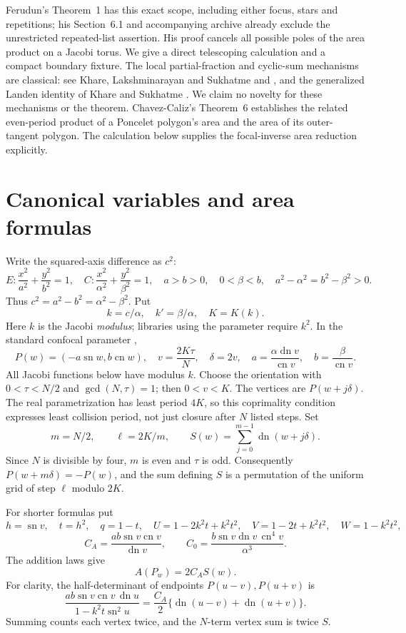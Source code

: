 \documentclass[11pt,letterpaper]{article}
\DeclareMathOperator{\sn}{sn}
\DeclareMathOperator{\cn}{cn}
\DeclareMathOperator{\dn}{dn}
\begin{document}
Ferudun's Theorem~1 \cite{ferudun} has this exact scope, including
either focus, stars and repetitions; his Section~6.1 and accompanying
archive already exclude the unrestricted repeated-list assertion.
His proof cancels all possible poles of the area product on a Jacobi
torus. We give a direct telescoping calculation and a compact
boundary fixture. The local partial-fraction and cyclic-sum
mechanisms are classical: see Khare, Lakshminarayan and Sukhatme
\cite[Eq.~(42)]{local} and \cite[Eq.~(20)]{cyclic}, and the generalized
Landen identity of Khare and Sukhatme \cite[Eq.~(13)]{landen}.
We claim no novelty for these mechanisms or the theorem.
Chavez-Caliz's Theorem~6 \cite{chavez} establishes the related
even-period product of a Poncelet polygon's area and the area of
its outer-tangent polygon. The calculation below supplies the
focal-inverse area reduction explicitly.

\section{Canonical variables and area formulas}
Write the squared-axis difference as $c^2$:
\[
 E:\frac{x^2}{a^2}+\frac{y^2}{b^2}=1,\quad
 C:\frac{x^2}{\alpha^2}+\frac{y^2}{\beta^2}=1,\quad
 a>b>0,\quad 0<\beta<b,\quad
 a^2-\alpha^2=b^2-\beta^2>0.
\]
Thus $c^2=a^2-b^2=\alpha^2-\beta^2$. Put
\[
 k=c/\alpha,\quad k'=\beta/\alpha,\quad K=K(k).
\]
Here $k$ is the Jacobi \emph{modulus}; libraries using the parameter
require $k^2$. In the standard confocal parameter
\cite[Theorem~4.3 and Eq.~(4.9)]{stachel},
\begin{equation}\label{canonical}
 P(w)=(-a\sn w,b\cn w),\quad
 v=\frac{2K\tau}{N},\quad \delta=2v,\quad
 a=\frac{\alpha\dn v}{\cn v},\quad b=\frac{\beta}{\cn v}.
\end{equation}
All Jacobi functions below have modulus $k$.
Choose the orientation with $0<\tau<N/2$ and $\gcd(N,\tau)=1$;
then $0<v<K$. The vertices are $P(w+j\delta)$.
The real parametrization has least period $4K$, so this coprimality
condition expresses least collision period, not just closure after
$N$ listed steps. Set
\[
 m=N/2,\qquad \ell=2K/m,\qquad
 S(w)=\sum_{j=0}^{m-1}\dn(w+j\delta).
\]
Since $N$ is divisible by four, $m$ is even and $\tau$ is odd.
Consequently $P(w+m\delta)=-P(w)$, and the sum defining $S$ is a
permutation of the uniform grid of step $\ell$ modulo $2K$.

For shorter formulas put
\[
 h=\sn v,\quad t=h^2,\quad q=1-t,\quad
 U=1-2k^2t+k^2t^2,\quad V=1-2t+k^2t^2,\quad W=1-k^2t^2,
\]
\[
 C_A=\frac{ab\sn v\cn v}{\dn v},\qquad
 C_0=\frac{b\sn v\dn v\,\cn^4v}{\alpha^3}.
\]
The addition laws \cite[Section~22.8]{dlmf} give
\begin{equation}\label{ordinary}
                         A(P_w)=2C_A S(w).
\end{equation}
For clarity, the half-determinant of endpoints
$P(u-v),P(u+v)$ is
\[
 \frac{ab\sn v\cn v\,\dn u}{1-k^2t\sn^2u}
 =\frac{C_A}{2}\{\dn(u-v)+\dn(u+v)\}.
\]
Summing counts each vertex twice, and the $N$-term vertex sum is
twice $S$.
\end{document}
